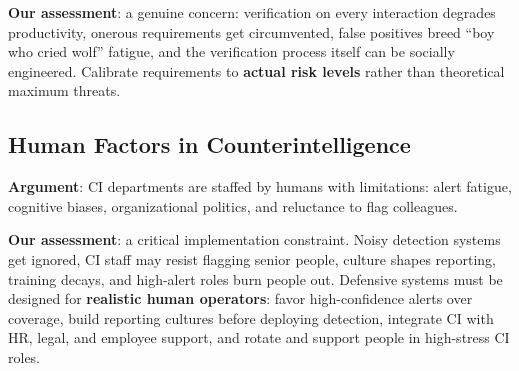 \documentclass[11pt,letterpaper]{article}
\begin{document}
\textbf{Our assessment}: a genuine concern: verification on every interaction degrades productivity, onerous requirements get circumvented, false positives breed ``boy who cried wolf'' fatigue, and the verification process itself can be socially engineered. Calibrate requirements to \textbf{actual risk levels} rather than theoretical maximum threats.

\subsection{Human Factors in Counterintelligence}

\textbf{Argument}: CI departments are staffed by humans with limitations: alert fatigue, cognitive biases, organizational politics, and reluctance to flag colleagues.

\textbf{Our assessment}: a critical implementation constraint. Noisy detection systems get ignored, CI staff may resist flagging senior people, culture shapes reporting, training decays, and high-alert roles burn people out. Defensive systems must be designed for \textbf{realistic human operators}: favor high-confidence alerts over coverage, build reporting cultures before deploying detection, integrate CI with HR, legal, and employee support, and rotate and support people in high-stress CI roles.
\end{document}
